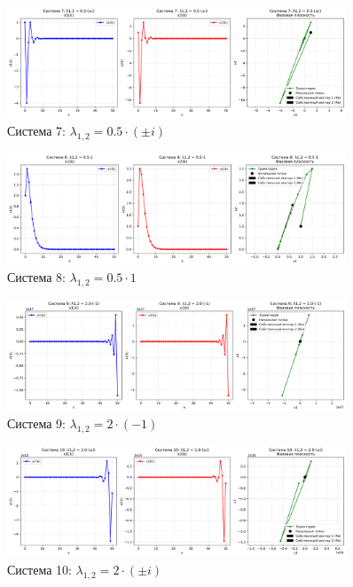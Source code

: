 \begin{figure}[H]
    \centering
    \includegraphics[width=0.9\textwidth]{images/task2/system7_lambda_pure_imaginary_scaled.png}
    \caption{Система 7: $\lambda_{1,2} = 0.5\cdot(\pm i)$}
\end{figure}

\begin{figure}[H]
    \centering
    \includegraphics[width=0.9\textwidth]{images/task2/system8_lambda_plus1_scaled.png}
    \caption{Система 8: $\lambda_{1,2} = 0.5\cdot 1$}
\end{figure}

\begin{figure}[H]
    \centering
    \includegraphics[width=0.9\textwidth]{images/task2/system9_lambda_minus1_scaled_up.png}
    \caption{Система 9: $\lambda_{1,2} = 2\cdot(-1)$}
\end{figure}

\begin{figure}[H]
    \centering
    \includegraphics[width=0.9\textwidth]{images/task2/system10_lambda_pure_imaginary_scaled_up.png}
    \caption{Система 10: $\lambda_{1,2} = 2\cdot(\pm i)$}
\end{figure}

